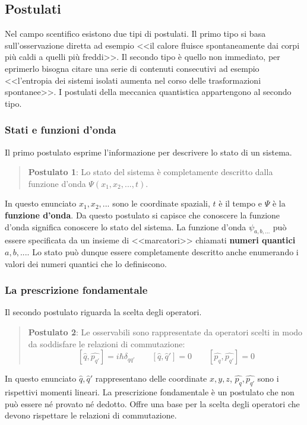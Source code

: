 \subsection{Postulati}
Nel campo scentifico esistono due tipi di postulati. Il primo tipo si basa sull'osservazione diretta ad esempio <<il calore fluisce spontaneamente dai corpi più caldi a quelli più freddi>>. Il secondo tipo è quello non immediato, per eprimerlo bisogna citare una serie di contenuti consecutivi ad esempio <<l'entropia dei sistemi isolati aumenta nel corso delle trasformazioni spontanee>>. I postulati della meccanica quantistica appartengono al secondo tipo.

\subsubsection{Stati e funzioni d'onda}
Il primo postulato esprime l'informazione per descrivere lo stato di un sistema.
\begin{quote}
\textbf{Postulato 1}: Lo stato del sistema è completamente descritto dalla funzione d'onda $\Psi(x_1, x_2, ..., t)$.
\end{quote}
In questo enunciato $x_1, x_2, ...$ sono le coordinate spaziali, $t$ è il tempo e $\Psi$ è la \textbf{funzione d'onda}. Da questo postulato si capisce che conoscere la funzione d'onda significa conoscere lo stato del sistema. La funzione d'onda $\psi_{a, b, ...}$ può essere specificata da un insieme di <<marcatori>> chiamati \textbf{numeri quantici} $a, b, ...$. Lo stato può dunque essere completamente descritto anche enumerando i valori dei numeri quantici che lo definiscono.

\subsubsection{La prescrizione fondamentale}
Il secondo postulato riguarda la scelta degli operatori.
\begin{quote}
  \textbf{Postulato 2}: Le osservabili sono rappresentate da operatori scelti in modo da soddisfare le relazioni di commutazione:
  $$ [\hat{q}, \hat{p_{q'}}] = i \hbar \delta_{qq'} \qquad [\hat{q}, \hat{q}'] = 0 \qquad [\hat{p_q}, \hat{p_{q'}}] = 0$$
\end{quote}
In questo enunciato $\hat{q}, \hat{q}'$ rappresentano delle coordinate $x, y, z$, $\hat{p_q}, \hat{p_{q'}}$ sono i rispettivi momenti lineari. La prescrizione fondamentale è un postulato che non può essere né provato né dedotto. Offre una base per la scelta degli operatori che devono rispettare le relazioni di commutazione.

